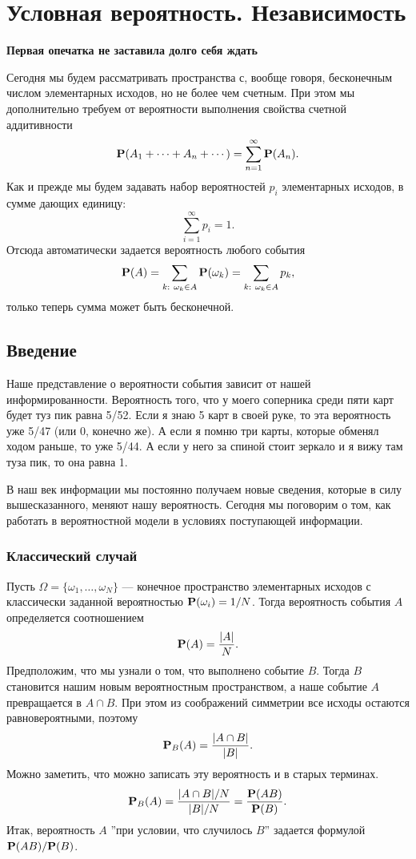 \documentclass[11 pt,russian]{article}
\begin{document}
\newenvironment{enumerate*}%
  {\begin{enumerate}%
    \setlength{\itemsep}{1pt}%
    \setlength{\parskip}{1pt}}%
  {\end{enumerate}}
  \newtheorem{Th}{Теорема}
    \newtheorem{Lemm}{Лемма}
  \theoremstyle{definition}
  \newtheorem{Rem}{Замечание}
  \newtheorem{Que}{Вопрос}
  \newtheorem{Exam}{Пример}
    \newtheorem{Def}{Определение}
\section{Условная вероятность. Независимость}
{\bf Первая опечатка не заставила долго себя ждать}

Сегодня мы будем рассматривать пространства с, вообще говоря, бесконечным числом элементарных исходов, но не более чем счетным. 
При этом мы дополнительно требуем от вероятности выполнения свойства счетной аддитивности
$$
{\bf P}(A_1 + \dotsb + A_n +\dotsb) = \sum_{n=1}^{\infty} {\bf P}(A_n). 
$$
Как и прежде мы будем задавать набор вероятностей $p_i$ элементарных исходов, в сумме дающих единицу:
$$
\sum_{i=1}^{\infty} p_i = 1.
$$
Отсюда автоматически задается вероятность любого события
$$
{\bf P}(A) = \sum_{k:\ \omega_k\in A} {\bf P}(\omega_k) = \sum_{k:\ \omega_k\in A} p_k,
$$
только теперь сумма может быть бесконечной.
\subsection{Введение}
Наше представление о вероятности события зависит от нашей информированности. Вероятность того, что у моего соперника среди пяти карт будет туз пик равна 5/52. Если я знаю 5 карт в своей руке, то эта вероятность уже 5/47 (или 0, конечно же). А если я помню три карты, которые обменял ходом раньше, то уже 5/44. А если у него за спиной стоит зеркало и я вижу там туза пик, то она равна 1. 

В наш век информации мы постоянно получаем новые сведения, которые в силу вышесказанного, меняют нашу вероятность. Сегодня мы поговорим о том, как работать в вероятностной модели в условиях поступающей информации.
\subsubsection{Классический случай}
Пусть $\Omega=\{\omega_1,\dotsc,\omega_N\}$ --- конечное пространство элементарных исходов с классически заданной вероятностью ${\bf P}(\omega_i) = 1/N$. Тогда вероятность события $A$ определяется соотношением
$$
{\bf P}(A) = \frac{|A|}{N}.
$$
Предположим, что мы узнали о том, что выполнено событие $B$. Тогда $B$ становится нашим новым вероятностным пространством, а наше событие $A$ превращается в $A\cap B$. При этом из соображений симметрии все исходы остаются равновероятными, поэтому
$$
{\bf P}_B(A) = \frac{|A\cap B|}{|B|}.
$$ 
Можно заметить, что можно записать эту вероятность и в старых терминах.
$$
{\bf P}_{B}(A) =  \frac{|A\cap B|/N}{|B|/N} =  \frac{{\bf P}(AB)}{{\bf P}(B)}.
$$
Итак, вероятность $A$ ''при условии, что случилось $B$'' задается формулой ${\bf P}(AB)/{\bf P}(B)$.
\end{document}
